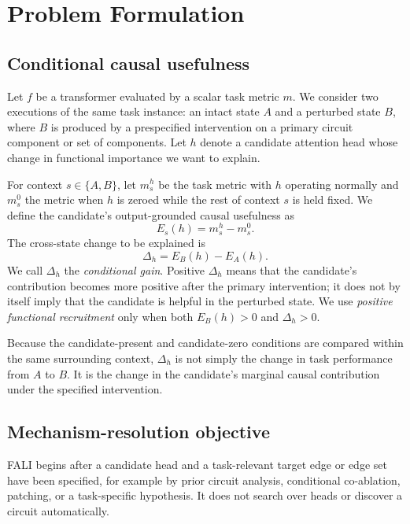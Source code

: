 \section{Problem Formulation}\label{sec:problem}

\subsection{Conditional causal usefulness}\label{sec:conditional-usefulness}

Let $f$ be a transformer evaluated by a scalar task metric $m$. We consider two executions of the same task instance: an intact state $A$ and a perturbed state $B$, where $B$ is produced by a prespecified intervention on a primary circuit component or set of components. Let $h$ denote a candidate attention head whose change in functional importance we want to explain.

For context $s\in\{A,B\}$, let $m_s^{h}$ be the task metric with $h$ operating normally and $m_s^{0}$ the metric when $h$ is zeroed while the rest of context $s$ is held fixed. We define the candidate's output-grounded causal usefulness as
\begin{equation}
E_s(h)=m_s^{h}-m_s^{0}.
\label{eq:context-effect}
\end{equation}
The cross-state change to be explained is
\begin{equation}
\Delta_h=E_B(h)-E_A(h).
\label{eq:conditional-gain}
\end{equation}
We call $\Delta_h$ the \emph{conditional gain}. Positive $\Delta_h$ means that the candidate's contribution becomes more positive after the primary intervention; it does not by itself imply that the candidate is helpful in the perturbed state. We use \emph{positive functional recruitment} only when both $E_B(h)>0$ and $\Delta_h>0$.

Because the candidate-present and candidate-zero conditions are compared within the same surrounding context, $\Delta_h$ is not simply the change in task performance from $A$ to $B$. It is the change in the candidate's marginal causal contribution under the specified intervention.

\subsection{Mechanism-resolution objective}\label{sec:mechanism-objective}

FALI begins after a candidate head and a task-relevant target edge or edge set have been specified, for example by prior circuit analysis, conditional co-ablation, patching, or a task-specific hypothesis. It does not search over heads or discover a circuit automatically.

